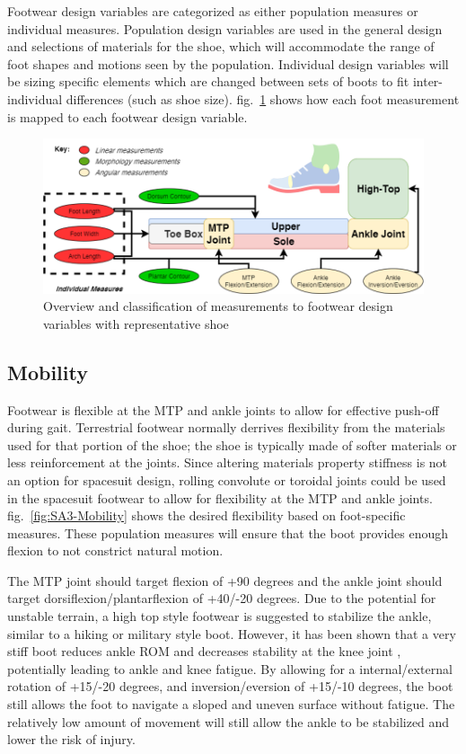 \documentclass[defaultstyle,11pt]{comps}
\begin{document}
Footwear design variables are categorized as either population measures or individual measures.
Population design variables are used in the general design and selections of materials for the shoe, which will accommodate the range of foot shapes and motions seen by the population.
Individual design variables will be sizing specific elements which are changed between sets of boots to fit inter-individual differences (such as shoe size).
fig.~\ref{fig:SA3-Overview} shows how each foot measurement is mapped to each footwear design variable.

\begin{figure}
\hypertarget{fig:SA3-Overview}{%
\centering
\includegraphics{../fig/SA3/Overview.png}
\caption{Overview and classification of measurements to footwear design variables with representative shoe}\label{fig:SA3-Overview}
}
\end{figure}

\hypertarget{mobility}{%
\subsection{Mobility}\label{mobility}}

Footwear is flexible at the MTP and ankle joints to allow for effective push-off during gait. Terrestrial footwear normally derrives flexibility from the materials used for that portion of the shoe; the shoe is typically made of softer materials or less reinforcement at the joints. Since altering materials property stiffness is not an option for spacesuit design, rolling convolute or toroidal joints could be used in the spacesuit footwear to allow for flexibility at the MTP and ankle joints\citep{Harris2001}. fig.~\ref{fig:SA3-Mobility} shows the desired flexibility based on foot-specific measures. These population measures will ensure that the boot provides enough flexion to not constrict natural motion.

The MTP joint should target flexion of +90 degrees and the ankle joint should target dorsiflexion/plantarflexion of +40/-20 degrees.
Due to the potential for unstable terrain, a high top style footwear is suggested to stabilize the ankle, similar to a hiking or military style boot.
However, it has been shown that a very stiff boot reduces ankle ROM and decreases stability at the knee joint \citep{Bohm2010}, potentially leading to ankle and knee fatigue.
By allowing for a internal/external rotation of +15/-20 degrees, and inversion/eversion of +15/-10 degrees, the boot still allows the foot to navigate a sloped and uneven surface without fatigue.
The relatively low amount of movement will still allow the ankle to be stabilized and lower the risk of injury.
\end{document}
